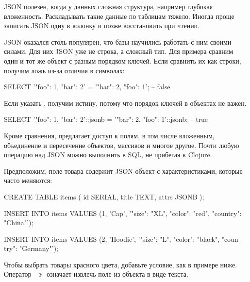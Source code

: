 JSON полезен, когда у данных сложная структура, например глубокая вложенность. Раскладывать такие данные по таблицам тяжело. Иногда проще записать JSON одну в колонку и позже восстановить при чтении.

JSON оказался столь популярен, что базы научились работать с ним своими силами. Для них JSON уже не строка, а сложный тип. Для примера сравним один и тот же объект с разным порядком ключей. Если сравнить их как строки, получим ложь из-за отличия в символах:

\begin{english}
  \begin{sql}
SELECT '{"foo": 1, "bar": 2}' =
       '{"bar": 2, "foo": 1}';
-- false
  \end{sql}
\end{english}

Если указать , получим истину, потому что порядок ключей в объектах не важен.

\begin{english}
  \begin{sql}
SELECT '{"foo": 1, "bar": 2}'::jsonb =
       '{"bar": 2, "foo": 1}'::jsonb;
-- true
  \end{sql}
\end{english}

Кроме сравнения,  предлагает доступ к полям, в том числе вложенным, объединение и пересечение объектов, массивов и многое другое. Почти любую операцию над JSON можно выполнить в SQL, не прибегая к Clojure.

Предположим, поле  товара содержит JSON-объект с характеристиками, которые часто меняются:

\begin{english}
  \begin{sql}
CREATE TABLE items (
  id SERIAL, title TEXT, attrs JSONB
);

INSERT INTO items VALUES
  (1, 'Cap', '{"size": "XL",
               "color": "red",
               "country": "China"}');

INSERT INTO items VALUES
  (2, 'Hoodie', '{"size": "L",
                  "color": "black",
                  "country": "Germany"}');
  \end{sql}
\end{english}

Чтобы выбрать товары красного цвета, добавьте условие, как в примере ниже. Оператор $\twoheadrightarrow$ означает извлечь поле  из объекта в виде текста.

